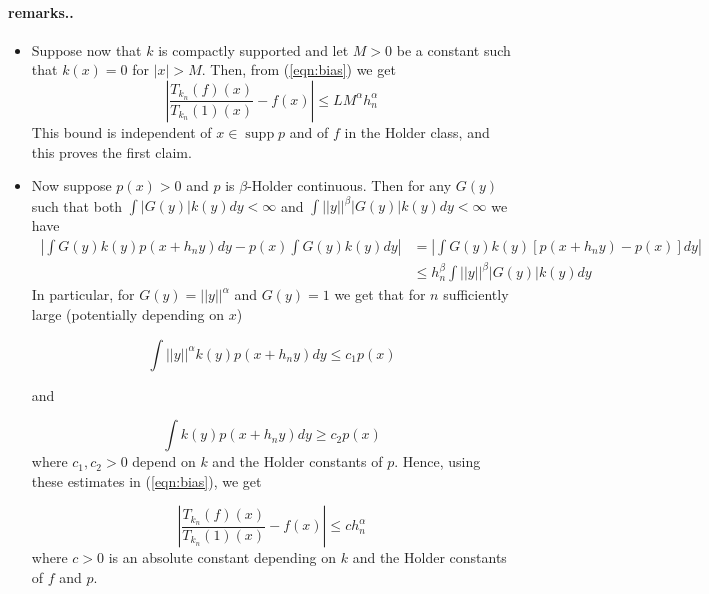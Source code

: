 \documentclass{article}
\DeclareMathOperator\supp{supp}
\begin{document}
\paragraph{remarks..}
\begin{itemize}
    \item Suppose now that $k$ is compactly supported and let $M>0$ be a constant such that $k(x)=0$ for $|x|>M$. Then, from (\ref{eqn:bias}) we get 
\begin{equation*}
    |\frac{T_{k_n}(f)(x)}{T_{k_n}(1)(x)}-f(x)|\leq LM^{\alpha}h_n^{\alpha}
\end{equation*}
This bound is independent of $x\in\supp{p}$ and of $f$ in the Holder class, and this proves the first claim.
    \item Now suppose $p(x)>0$ and $p$ is $\beta$-Holder continuous. Then for any $G(y)$ such that both 
    $\int |G(y)|k(y)dy<\infty$ and $\int ||y||^{\beta}|G(y)|k(y)dy<\infty$ we have
    \begin{equation}
    \
    \begin{split}
        |\int G(y)k(y)p(x+h_ny)dy-p(x)\int G(y)k(y)dy|&=|\int G(y)k(y)[p(x+h_ny)-p(x)]dy|\\
        &\leq h_n^{\beta}\int ||y||^{\beta}|G(y)|k(y)dy
    \end{split}
    \end{equation}
    In particular, for $G(y)=||y||^{\alpha}$ and $G(y)=1$ we get that for $n$ sufficiently large (potentially depending on $x$)
    
    \begin{equation*}
        \int ||y||^{\alpha}k(y)p(x+h_ny)dy\leq c_1 p(x)
    \end{equation*}
    
    and
    
    \begin{equation*}
        \int k(y)p(x+h_ny)dy\geq c_2p(x)
    \end{equation*}
    where $c_1,c_2>0$ depend on $k$ and the Holder constants of $p$.
    Hence, using these estimates in (\ref{eqn:bias}), we get
    
    \begin{equation*}
        |\frac{T_{k_n}(f)(x)}{T_{k_n}(1)(x)}-f(x)|\leq ch_n^{\alpha}
    \end{equation*}
    where $c>0$ is an absolute constant depending on $k$ and the Holder constants of $f$ and $p$.
\end{itemize}
\end{document}
